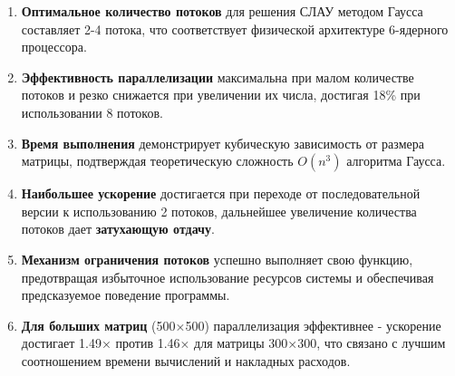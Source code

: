 \begin{enumerate}
\item \textbf{Оптимальное количество потоков} для решения СЛАУ методом Гаусса составляет 2-4 потока, что соответствует физической архитектуре 6-ядерного процессора.

\item \textbf{Эффективность параллелизации} максимальна при малом количестве потоков и резко снижается при увеличении их числа, достигая 18\% при использовании 8 потоков.

\item \textbf{Время выполнения} демонстрирует кубическую зависимость от размера матрицы, подтверждая теоретическую сложность $O(n^3)$ алгоритма Гаусса.

\item \textbf{Наибольшее ускорение} достигается при переходе от последовательной версии к использованию 2 потоков, дальнейшее увеличение количества потоков дает \textbf{затухающую отдачу}.

\item \textbf{Механизм ограничения потоков} успешно выполняет свою функцию, предотвращая избыточное использование ресурсов системы и обеспечивая предсказуемое поведение программы.

\item \textbf{Для больших матриц} (500×500) параллелизация эффективнее - ускорение достигает 1.49× против 1.46× для матрицы 300×300, что связано с лучшим соотношением времени вычислений и накладных расходов.
\end{enumerate}
